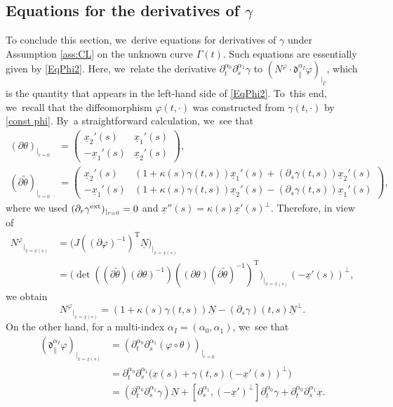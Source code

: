 \documentclass[JEP,XML,SOM,Unicode,NoFloatCountersInSection,published]{cedram}
\newcommand{\dpar}{{\mathfrak d}_{\parallel}}
\newcommand{\dt}{\partial_t}
\newcommand{\ul}[1]{\underline{#1}}
\newcommand{\itGamma}{\mathit{\Gamma}}
\theoremstyle{definition}
\begin{document}
\subsection{Equations for the derivatives of $\gamma$}\label{subsect:Eqg}
To conclude this section, we~derive equations for derivatives of $\gamma$ under Assumption \ref{ass:CL} on the unknown curve $\itGamma(t)$.
Such equations are essentially given by \eqref{EqPhi2}.
Here, we~relate the derivative $\dt^{\alpha_0}\partial_s^{\alpha_1}\gamma$ to $(N^\varphi\cdot\dpar^{\alpha_I}\varphi)_{\vert_{\ul{\itGamma}}}$,
which is the quantity that appears in the left-hand side of \eqref{EqPhi2}.
To~this end, we~recall that the diffeomorphism $\varphi(t,\cdot)$ was constructed from $\gamma(t,\cdot)$ by \eqref{const phi}. By~a straightforward calculation, we~see that
\begin{align*}
(\partial\theta)_{\vert_{r=0}} &=
\begin{pmatrix}
\ul{x}_2'(s) & \ul{x}_1'(s) \\
-\ul{x}_1'(s) & \ul{x}_2'(s)
\end{pmatrix}, \\
(\partial\tilde{\theta})_{\vert_{r=0}} &=
\begin{pmatrix}
\ul{x}_2'(s) & (1+\kappa(s)\gamma(t,s))\ul{x}_1'(s) + (\partial_s\gamma(t,s))\ul{x}_2'(s) \\
-\ul{x}_1'(s) & (1+\kappa(s)\gamma(t,s))\ul{x}_2'(s) - (\partial_s\gamma(t,s))\ul{x}_1'(s)
\end{pmatrix},
\end{align*}
where we used $(\partial_r\gamma^{\rm ext})_{\vert_{r=0}} = 0$ and $\ul{x}''(s) = \kappa(s)\ul{x}'(s)^\perp$.
Therefore, in view of
\begin{align*}
{N^\varphi}_{\vert_{x=\ul{x}(s)}}
&= \bigl(J((\partial\varphi)^{-1})^\mathrm{T}\ul{N}\bigr)_{\vert_{x=\ul{x}(s)}}\\
&= \bigl(\det((\partial\widetilde{\theta})(\partial\theta)^{-1}) ((\partial\theta)(\partial\widetilde{\theta})^{-1})^\mathrm{T}\bigr)_{\vert_{x=\ul{x}(s)}}
(-\ul{x}'(s))^\perp,
\end{align*}
we obtain
\begin{equation}\label{Nphi2}
{N^\varphi}_{\vert_{x=\ul{x}(s)}}
= (1+\kappa(s)\gamma(t,s))\ul{N} - (\partial_s\gamma)(t,s)\ul{N}^\perp.
\end{equation}
On the other hand, for a multi-index $\alpha_I=(\alpha_0,\alpha_1)$, we~see that
\begin{align*}
(\dpar^{\alpha_I}\varphi)_{\vert_{x=\ul{x}(s)}}
&= (\dt^{\alpha_0}\partial_s^{\alpha_1}(\varphi\circ\theta))_{\vert_{r=0}} \\
&= \dt^{\alpha_0}\partial_s^{\alpha_1}\bigl(\ul{x}(s)+\gamma(t,s)(-\ul{x}'(s))^\perp \bigr) \\
&= (\dt^{\alpha_0}\partial_s^{\alpha_1}\gamma)\ul{N}
+ [\partial_s^{\alpha_1},(-\ul{x}')^\perp]\dt^{\alpha_0}\gamma + \dt^{\alpha_0}\partial_s^{\alpha_1}\ul{x}.
\end{align*}
\end{document}
